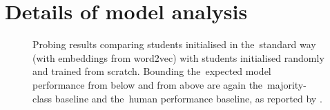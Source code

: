 \documentclass[bsc,frontabs,singlespacing,parskip,deptreport]{infthesis}
\begin{document}
\chapter{Details of model analysis}{
  \label{chap:A-model-analysis}
  \begin{figure}[h!tb]
    \centering
    \caption{Probing results comparing students initialised in the~standard way (with embeddings from word2vec) with students initialised randomly and trained from scratch. Bounding the~expected model performance from below and from above are again the~majority-class baseline and the~human performance baseline, as reported by \citet{Conneau_2018}.}

\end{figure}}
\end{document}
